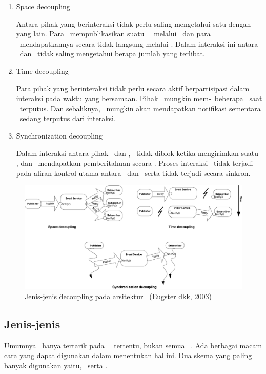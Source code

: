 \begin{enumerate}[noitemsep,nolistsep,leftmargin=0cm,itemindent=.5cm,listparindent=\parindent]
    \item \f{Space decoupling}

    Antara pihak yang berinteraksi tidak perlu saling mengetahui satu dengan
    yang lain. Para \publisher~mempublikasikan suatu \event~\pubsub~melalui
    \eventservice~dan para \subscriber~mendapatkannya secara tidak langsung
    melalui \eventservice.  Dalam interaksi ini antara \publisher~dan
    \subscriber~tidak saling mengetahui berapa jumlah yang terlibat.  \item \f{Time
    decoupling}

    Para pihak yang berinteraksi tidak perlu secara aktif berpartisipasi dalam
    interaksi pada waktu yang bersamaan. Pihak \publisher~mungkin
    mem-\publish~beberapa \event~saat \subscriber~terputus. Dan sebaliknya,
    \subscriber~mungkin akan mendapatkan notifikasi sementara \publisher~sedang
    terputus dari interaksi.  \item \f{Synchronization decoupling}

    Dalam interaksi antara pihak \publisher~dan \subscriber, \publisher~tidak diblok
    ketika mengirimkan suatu \event, dan \subscriber~mendapatkan pemberitahuan secara
    \asynch. Proses interaksi \event~tidak terjadi pada aliran kontrol utama antara
    \publisher~dan \subscriber~serta tidak terjadi secara sinkron.
\end{enumerate}
\begin{figure}
    \centering
    \includegraphics[scale=0.10]
			{images/2-decoupling.png}
    \caption{Jenis-jenis \f{decoupling} pada arsitektur \pubsub~(Eugster dkk, 2003)}
    \label{fig:decoupling}
\end{figure}

\subsection{Jenis-jenis \PubSub}
Umumnya \subscriber~hanya tertarik pada \event~\pubsub~tertentu, bukan semua \event~\pubsub.
Ada berbagai macam cara yang dapat digunakan dalam menentukan hal ini.
Dua skema yang paling banyak digunakan yaitu, \topicbased~serta \contentbased.

